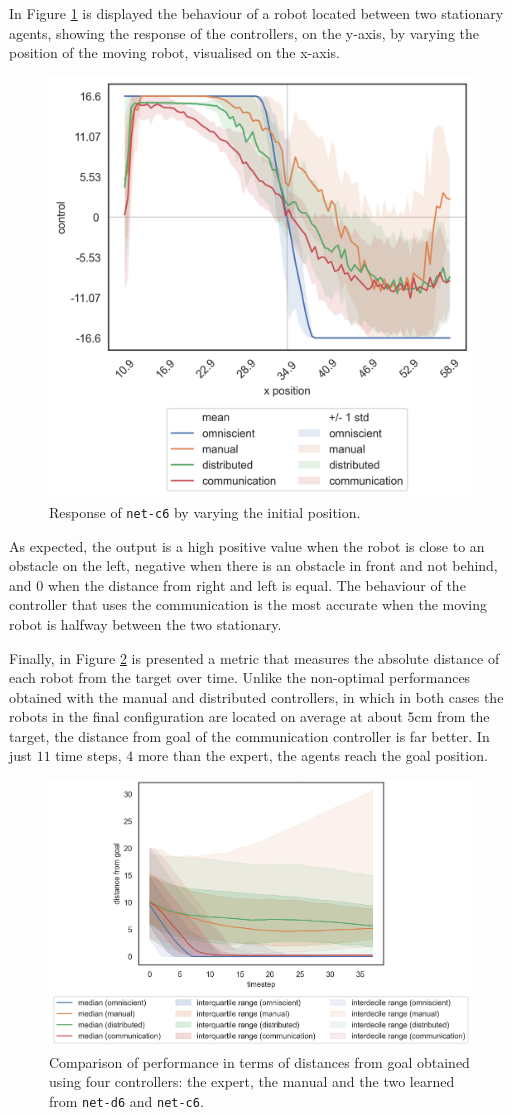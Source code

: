 In Figure \ref{fig:net-c6responseposition} is displayed the behaviour of a robot 
located between two stationary agents, showing the response of the controllers, 
on the y-axis, by varying the position of the moving robot, visualised on the 
x-axis.  
\begin{figure}[!htb]
	\centering
	\includegraphics[width=.45\textwidth]{contents/images/net-c6/response-varying_init_position-communication}%
	\caption{Response of \texttt{net-c6} by varying the initial position.}
	\label{fig:net-c6responseposition}
\end{figure}
As expected, the output is a high positive value when the robot is close to an 
obstacle on the left, negative when there is an obstacle in front and not behind, 
and $0$ when the distance from right and left is equal.
The behaviour of the controller that uses the communication is the most accurate 
when the moving robot is halfway between the two stationary.

Finally, in Figure \ref{fig:net-c6distance} is presented a metric that measures the 
absolute distance of each robot from the target over time.
Unlike the non-optimal performances obtained with the manual and distributed 
controllers, in which in both cases the robots in the final configuration are 
located on average at about $5$\gls{cm} from the target, the distance from goal 
of the communication controller is far better. In just $11$ time steps, $4$ more 
than the expert, the agents reach the goal position.
\begin{figure}[H]
	\centering
	\includegraphics[width=.65\textwidth]{contents/images/net-c6/distances-from-goal-compressed-communication}%
	\caption[Evaluation of \texttt{net-c6} distances from goal.]{Comparison of 
		performance in terms of distances from goal obtained using four controllers: 
		the expert, the manual and the two learned from \texttt{net-d6} and 
		\texttt{net-c6}.}
	\label{fig:net-c6distance}
\end{figure}

